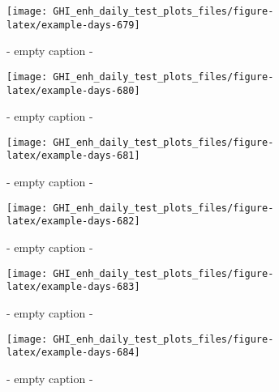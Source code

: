 \documentclass[
  10pt,
  a4paper,oneside]{article}
\begin{document}
\begin{figure}[H]

{\centering \texttt{[image: GHI\_enh\_daily\_test\_plots\_files/figure-latex/example-days-679]} 

}

\caption{ - empty caption - }\label{fig:example-days-679}
\end{figure}

\begin{figure}[H]

{\centering \texttt{[image: GHI\_enh\_daily\_test\_plots\_files/figure-latex/example-days-680]} 

}

\caption{ - empty caption - }\label{fig:example-days-680}
\end{figure}

\begin{figure}[H]

{\centering \texttt{[image: GHI\_enh\_daily\_test\_plots\_files/figure-latex/example-days-681]} 

}

\caption{ - empty caption - }\label{fig:example-days-681}
\end{figure}

\begin{figure}[H]

{\centering \texttt{[image: GHI\_enh\_daily\_test\_plots\_files/figure-latex/example-days-682]} 

}

\caption{ - empty caption - }\label{fig:example-days-682}
\end{figure}

\begin{figure}[H]

{\centering \texttt{[image: GHI\_enh\_daily\_test\_plots\_files/figure-latex/example-days-683]} 

}

\caption{ - empty caption - }\label{fig:example-days-683}
\end{figure}

\begin{figure}[H]

{\centering \texttt{[image: GHI\_enh\_daily\_test\_plots\_files/figure-latex/example-days-684]} 

}

\caption{ - empty caption - }\label{fig:example-days-684}
\end{figure}
\end{document}

